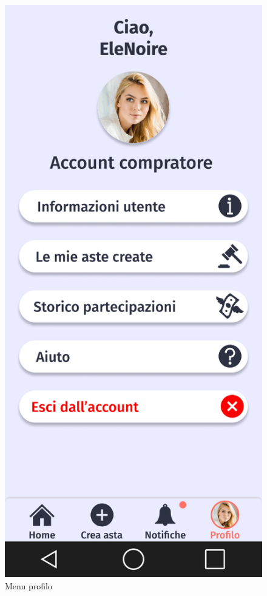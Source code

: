 \begin{figure}[!htb]
\begin{minipage}{0.32\textwidth}
            \includegraphics[width=.7\linewidth]{Immagini/Frames/Compratore/C6.pdf}
            \caption{Menu profilo}
        \end{minipage}\hfill
    \end{figure}

